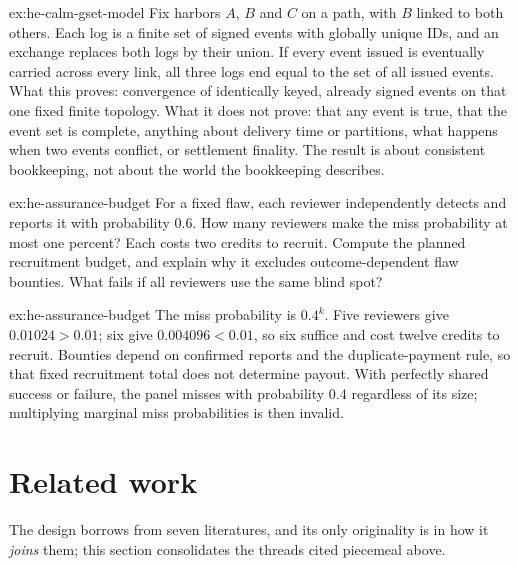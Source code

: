 \documentclass[11pt,a4paper]{article}
\theoremstyle{definition}
\theoremstyle{definition}
\theoremstyle{remark}
\begin{document}
\begin{pdsolution}{ex:he-calm-gset-model}
Fix harbors $A$, $B$ and $C$ on a path, with $B$ linked to both others. Each log is a
finite set of signed events with globally unique IDs, and an exchange replaces
both logs by their union. If every event issued is eventually carried across
every link, all three logs end equal to the set of all issued events. What
this proves: convergence of identically keyed, already signed events on that
one fixed finite topology. What it does not prove: that any event is true,
that the event set is complete, anything about delivery time or partitions,
what happens when two events conflict, or settlement finality. The result is
about consistent bookkeeping, not about the world the bookkeeping describes.
\end{pdsolution}

\begin{pdexercise}[kind=Trace,rating=2]{ex:he-assurance-budget}
For a fixed flaw, each reviewer independently detects and reports it with
probability $0.6$. How many reviewers make the miss probability at most one
percent? Each costs two credits to recruit. Compute the planned recruitment
budget, and explain why it excludes outcome-dependent flaw bounties. What
fails if all reviewers use the same blind spot?
\end{pdexercise}
\begin{pdsolution}{ex:he-assurance-budget}
The miss probability is $0.4^k$. Five reviewers give $0.01024>0.01$;
six give $0.004096<0.01$, so six suffice and cost twelve credits to recruit.
Bounties depend on confirmed reports and the duplicate-payment rule, so that
fixed recruitment total does not determine payout. With perfectly shared
success or failure, the panel misses with probability $0.4$ regardless of
its size; multiplying marginal miss probabilities is then invalid.
\end{pdsolution}


\section{Related work}\label{sec:related}

The design borrows from seven literatures, and its only originality is in how it
\emph{joins} them; this section consolidates the threads cited piecemeal above.
\end{document}
